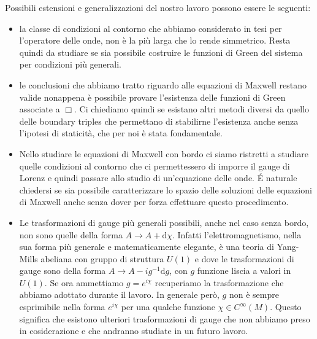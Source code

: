 \documentclass[11pt,a4paper]{article}
\begin{document}
	Possibili estensioni e generalizzazioni del nostro lavoro possono essere le seguenti:
	\begin{itemize}
		\item la classe di condizioni al contorno che abbiamo considerato in tesi per l'operatore delle onde, non è la più larga che lo rende simmetrico. Resta quindi da studiare se sia possibile costruire le funzioni di Green del sistema per condizioni più generali.
		\item le conclusioni che abbiamo tratto riguardo alle equazioni di Maxwell restano valide nonappena è possibile provare l'esistenza delle funzioni di Green associate a $\Box$. Ci chiediamo quindi se esistano altri metodi diversi da quello delle boundary triples che permettano di stabilirne l'esistenza anche senza l'ipotesi di staticità, che per noi è stata fondamentale.
		
		\item Nello studiare le equazioni di Maxwell con bordo ci siamo ristretti a studiare quelle condizioni al contorno che ci permettessero di imporre il gauge di Lorenz e quindi passare allo studio di un'equazione delle onde. \'E naturale chiedersi se sia possibile caratterizzare lo spazio delle soluzioni delle equazioni di Maxwell anche senza dover per forza effettuare questo procedimento.
		\item Le trasformazioni di gauge più generali possibili, anche nel caso senza bordo, non sono quelle della forma $A\to A+\mathrm{d}\chi$. Infatti l'elettromagnetismo, nella sua forma più generale e matematicamente elegante, è una teoria di Yang-Mills abeliana con gruppo di struttura $U(1)$ e dove le trasformazioni di gauge sono della forma $A\to A-ig^{-1}\mathrm{d}g$, con $g$ funzione liscia a valori in $U(1)$. Se ora ammettiamo $g=e^{i\chi}$ recuperiamo la trasformazione che abbiamo adottato durante il lavoro. In generale però, $g$ non è sempre esprimibile nella forma $e^{i\chi}$ per una qualche funzione $\chi\in C^\infty(M)$. Questo significa che esistono ulteriori trasformazioni di gauge che non abbiamo preso in cosiderazione e che andranno studiate in un futuro lavoro.
	\end{itemize}
	
	
	
	
	
	
	
	
	
	
	
	 
\end{document}
